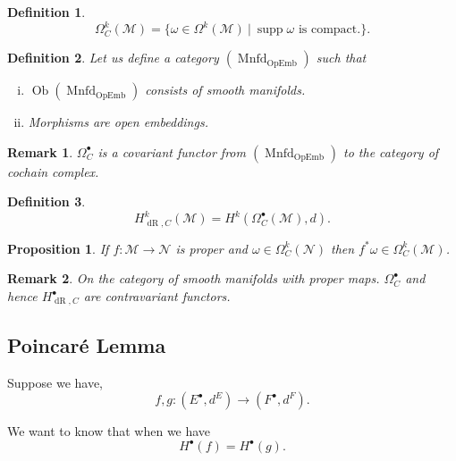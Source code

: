 \documentclass[10pt]{article}
\newtheorem{proposition}{Proposition}[section]
\newtheorem{definition}{Definition}[section]
\newtheorem{remark}{Remark}[section]
\DeclareMathOperator{\supp}{supp}
\DeclareMathOperator{\dR}{dR}
\DeclareMathOperator{\Ob}{Ob}
\DeclareMathOperator{\Mnfd}{Mnfd}
\DeclareMathOperator{\OpEmb}{OpEmb}
\newcommand{\M}[0]{\mathcal{M}}
\newcommand{\maniN}[0]{\mathcal{N}}
\newcommand{\sep}[0]{\:|\:}
\begin{document}
\begin{definition}
  \begin{equation*}
    \Omega_C^k(\M) = \{\omega\in\Omega^k(\M)\sep \supp\omega\text{ is compact.}\}.
  \end{equation*}
\end{definition}

\begin{definition}
  Let us define a category $(\Mnfd_{\OpEmb})$ such that 
  \begin{enumerate}[i).]
    \item $\Ob(\Mnfd_{\OpEmb})$ consists of smooth manifolds.
    \item Morphisms are open embeddings.
  \end{enumerate}
\end{definition}

\begin{remark}
  $\Omega^\bullet_C$ is a covariant functor from $(\Mnfd_{\OpEmb})$ to the category of cochain complex.
\end{remark}

\begin{definition}
  \begin{equation*}
    H^k_{\dR,C}(\M) = H^k(\Omega_C^\bullet(\M),d).
  \end{equation*}
\end{definition}

\begin{proposition}
  If $f:\M\to\maniN$ is proper and $\omega\in\Omega^k_C(\maniN)$ then $f^*\omega\in\Omega_C^k(\M)$.
\end{proposition}

\begin{remark}
  On the category of smooth manifolds with proper maps. $\Omega_C^\bullet$ and hence $H_{\dR,C}^\bullet$ are contravariant functors.
\end{remark}


\subsection{Poincaré Lemma}

Suppose we have,
\begin{equation*}
  f,g:(E^\bullet,d^E)\to(F^\bullet,d^F).
\end{equation*}

We want to know that when we have
\begin{equation*}
  H^\bullet(f) = H^\bullet(g).
\end{equation*}
\end{document}
